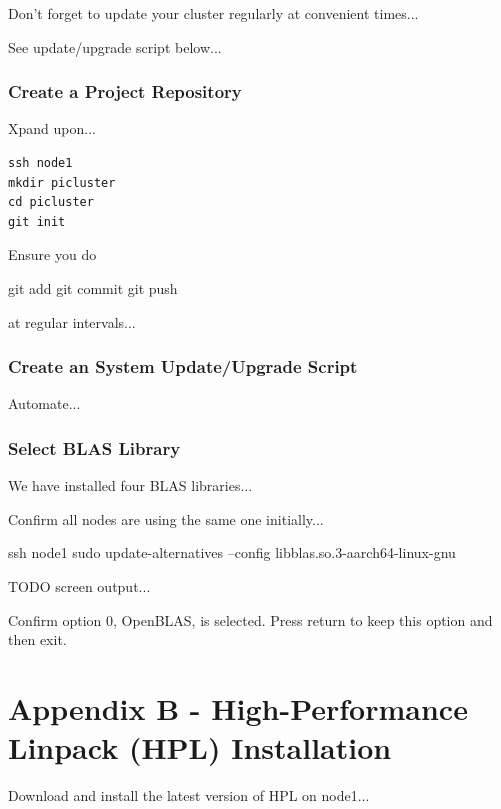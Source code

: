 \documentclass{article}
\begin{document}
Don't forget to update your cluster regularly at convenient times...

See update/upgrade script below...



\subsubsection{Create a Project Repository}

Xpand upon...

\begin{lstlisting}[frame=single]
ssh node1
mkdir picluster
cd picluster
git init
\end{lstlisting}

Ensure you do  

git add
git commit
git push

at regular intervals...



\subsubsection{Create an System Update/Upgrade Script}

Automate...





\subsubsection{Select BLAS Library}

We have installed four BLAS libraries...

Confirm all nodes are using the same one initially...

ssh node1
sudo update-alternatives --config libblas.so.3-aarch64-linux-gnu

TODO screen output...

Confirm option 0, OpenBLAS, is selected. Press return to keep this option and then exit.



%
%
\clearpage\section{Appendix B - High-Performance Linpack (HPL) Installation}

Download and install the latest version of HPL on node1...
\end{document}
